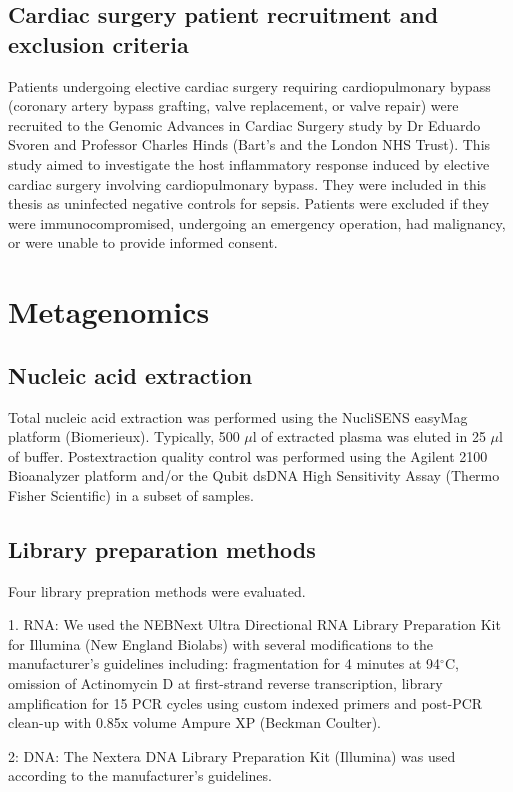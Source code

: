 \subsection{Cardiac surgery patient recruitment and exclusion criteria}
Patients undergoing elective cardiac surgery requiring cardiopulmonary bypass (coronary artery bypass grafting, valve replacement, or valve repair) were recruited to the Genomic Advances in Cardiac Surgery study by Dr Eduardo Svoren and Professor Charles Hinds (Bart's and the London NHS Trust). This study aimed to investigate the host inflammatory response induced by elective cardiac surgery involving cardiopulmonary bypass. They were included in this thesis as uninfected negative controls for sepsis. Patients were excluded if they were immunocompromised, undergoing an emergency operation, had malignancy, or were unable to provide informed consent. 


\section{Metagenomics}
\subsection{Nucleic acid extraction}

Total nucleic acid extraction was performed using the NucliSENS easyMag platform (Biomerieux). Typically, 500 $\mu$l of extracted plasma was eluted in 25 $\mu$l of buffer. Postextraction quality control was performed using the Agilent 2100 Bioanalyzer platform and/or the Qubit dsDNA High Sensitivity Assay (Thermo Fisher Scientific) in a subset of samples.

\subsection{Library preparation methods}
Four library prepration methods were evaluated.

1. RNA: We used the NEBNext Ultra Directional RNA Library Preparation Kit for Illumina (New England Biolabs) with several modifications to the manufacturer’s guidelines including: fragmentation for 4 minutes at 94$^{\circ}$C, omission of Actinomycin D at first-strand reverse transcription, library amplification for 15 PCR cycles using custom indexed primers and post-PCR clean-up with 0.85x volume Ampure XP (Beckman Coulter).

2: DNA: The Nextera DNA Library Preparation Kit (Illumina) was used according to the manufacturer's guidelines.

